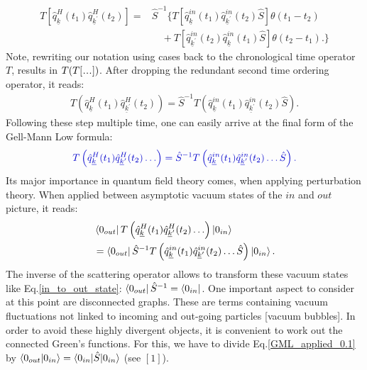 \documentclass[12pt, titlepage]{article}
\newcommand\mydots{\makebox[1em][c]{.\hfil.\hfil.}}
\begin{document}
\begin{equation}
\begin{split}
T\left[
\hat{q}^{H}_{\underline{k}}(t_1)
\hat{q}^{H}_{\underline{k}^{\prime}}(t_2)
\right]=
&\hat{S}^{-1}
\Big\{
T\left[
	\hat{q}^{in}_{\underline{k}}(t_1)
	\hat{q}^{in}_{\underline{k}^{\prime}}(t_2)
	\hat{S}
\right]
				  \theta(t_1 - t_2)
	\\				  
				 &\quad +
T\left[
	\hat{q}^{in}_{\underline{k}^{\prime}}(t_2)
	\hat{q}^{in}_{\underline{k}}(t_1)
	\hat{S}
\right]
        \theta(t_2 - t_1).
    \Big\}  
    \end{split}
\end{equation}
Note, rewriting our notation using cases back to the chronological time operator $ T $, results in $ T(T[\mydots]) $. After dropping the redundant second time ordering operator, it reads:
\begin{equation}\label{Gell-Mann_Low_formula_for_2}
\begin{split}
T\left( 
\hat{q}^{H}_{\underline{k}}(t_1)
\hat{q}^{H}_{\underline{k}^{\prime}}(t_2)
\right) 
=
\hat{S}^{-1}
T\left( 
\hat{q}^{in}_{\underline{k}}(t_1)
\hat{q}^{in}_{\underline{k}^{\prime}}(t_2)
\hat{S}
\right).
    \end{split}
\end{equation}
Following these step multiple time, one can easily  arrive at the final form of the Gell-Mann Low formula:
\begin{equation}\label{Gell-Mann_Low_formula}
\begin{split}
\textcolor[RGB]{0,0,204}{
T\left( 
\hat{q}^{H}_{\underline{k}}(t_1)
\hat{q}^{H}_{\underline{k}^{\prime}}(t_2)
\ldots
\right) 
=
\hat{S}^{-1}
T\left( 
\hat{q}^{in}_{\underline{k}}(t_1)
\hat{q}^{in}_{\underline{k}^{\prime}}(t_2)
\ldots
\hat{S}
\right).
}
    \end{split}
\end{equation}
Its major importance in quantum field theory comes, when applying perturbation theory. When applied between asymptotic vacuum states of the $ in $ and $ out $ picture, it reads:
\begin{equation}\label{GML_applied_0.1}
\begin{split}
&\bra{0_{out}}
T\left( 
\hat{q}^{H}_{\underline{k}}(t_1)
\hat{q}^{H}_{\underline{k}^{\prime}}(t_2)
\ldots
\right) 
\ket{0_{in}}
\\
&=
\bra{0_{out}}
\hat{S}^{-1}
T\left( 
\hat{q}^{in}_{\underline{k}}(t_1)
\hat{q}^{in}_{\underline{k}^{\prime}}(t_2)
\ldots
\hat{S}
\right)
\ket{0_{in}}
.
\end{split}
\end{equation}
The inverse of the scattering operator allows to transform these vacuum states like Eq.\enskip\eqref{in_to_out_state}: $\bra{0_{out}}\hat{S}^{-1}=\bra{0_{in}}$. One important aspect to consider at this point are disconnected graphs. These are terms containing vacuum fluctuations not linked to incoming and out-going particles [vacuum bubbles]. In order to avoid these highly divergent objects, it is convenient to work out the connected Green's functions. For this, we have to divide Eq.\enskip\eqref{GML_applied_0.1} by $ \braket{0_{out}|0_{in}} = \braket{0_{in}|\hat{S}|0_{in}} $ (see $ [1]$).
\newpage
\end{document}
